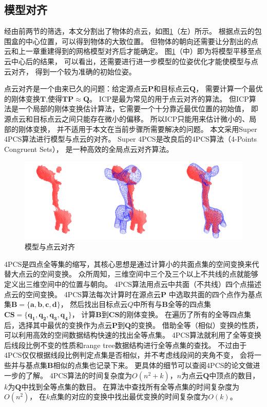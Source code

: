 \subsection{模型对齐}

经由前两节的筛选，本文分割出了物体的点云，如图\ref{rigid_fit}（左）所示。
根据点云的包围盒的中心位置，可以得到物体的大致位置。
但物体的朝向还需要让分割出的点云和上一章重建得到的网格模型对齐后才能确定。
图\ref{rigid_fit}（中）即为将模型平移至点云中心后的结果，
可以看出，还需要进行进一步模型的位姿优化才能使模型与点云对齐，
得到一个较为准确的初始位姿。

点云对齐是一个由来已久的问题：给定源点云$\bm{P}$和目标点云$\bm{Q}$，
需要计算一个最优的刚体变换$\bm{T}$,使得$\bm{TP} \approx \bm{Q}$。
ICP是最为常见的用于点云对齐的算法。
但ICP算法是一个局部的刚体变换估计算法，它需要一个十分靠近最优位置的初始值，
即源点云和目标点云之间只能存在微小的偏移。
所以ICP只能用来估计微小的、局部的刚体变换，
并不适用于本文在当前步骤所需要解决的问题。
本文采用Super 4PCS算法\cite{mellado2014super}进行模型与点云的对齐。
Super 4PCS是改良后的4PCS算法（4-Points Congruent Sets）\cite{aiger20084}，
是一种高效的全局点云对齐算法。
\begin{figure}
    \centering
    \includegraphics[width = \textwidth]{./Pictures/rigidfitting.png}
    \caption{模型与点云对齐}
    \label{rigid_fit}
\end{figure}

4PCS是四点全等集的缩写，其核心思想是通过计算小的共面点集的空间变换来代替大点云的空间变换。
众所周知，三维空间中三个及三个以上不共线的点就能够定义出三维空间中的位置与朝向。
4PCS算法用点云中共面（不共线）四个点描述点云的空间变换。
4PCS算法每次计算时在源点云$\bm{P}$
中选取共面的四个点作为基点集$\bm{B}=\{\bm{a},\bm{b},\bm{c},\bm{d}\}$，
然后找出目标点云$Q$中所有与$\bm{B}$全等的四点集
$\bm{CS}=\{\bm{q_1},\bm{q_2},\bm{q_3},\bm{q_4}\}$，
计算$\bm{B}$到$\bm{CS}$的刚体变换。
在遍历了所有的全等四点集后，选择其中最优的变换作为点云$\bm{P}$到$\bm{Q}$的变换。
借助全等（相似）变换的性质，可以利用高效的空间数据结构快速的找出全等点集。
4PCS算法就利用了全等变换后线段比例不变的性质和range tree数据结构进行全等点集的查找。
不过由于4PCS仅仅根据线段比例判定点集是否相似，并不考虑线段间的夹角不变，
会将一些并与基点集$\bm{B}$相似的点集也记录下来。
更具体的细节可以查阅4PCS的论文做进一步的了解。
4PCS算法的时间复杂度为$O(n^2+k)$，$n$为点云$\bm{Q}$中顶点的数目，
$k$为$\bm{Q}$中找到全等点集的数目。
在算法中查找所有全等点集的时间复杂度为$O(n^2)$，
在$k$点集的对应的变换中找出最优变换的时间复杂度为$O(k)$。

